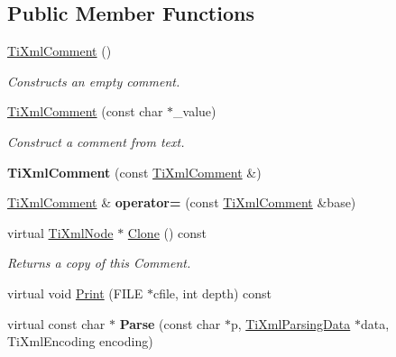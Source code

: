 \subsection*{Public Member Functions}
\begin{DoxyCompactItemize}
\item 
\hyperlink{classTiXmlComment_aaa3252031d3e8bd3a2bf51a1c61201b7}{Ti\+Xml\+Comment} ()\hypertarget{classTiXmlComment_aaa3252031d3e8bd3a2bf51a1c61201b7}{}\label{classTiXmlComment_aaa3252031d3e8bd3a2bf51a1c61201b7}

\begin{DoxyCompactList}\small\item\em Constructs an empty comment. \end{DoxyCompactList}\item 
\hyperlink{classTiXmlComment_a37e7802ef17bc03ebe5ae79bf0713d47}{Ti\+Xml\+Comment} (const char $\ast$\+\_\+value)\hypertarget{classTiXmlComment_a37e7802ef17bc03ebe5ae79bf0713d47}{}\label{classTiXmlComment_a37e7802ef17bc03ebe5ae79bf0713d47}

\begin{DoxyCompactList}\small\item\em Construct a comment from text. \end{DoxyCompactList}\item 
{\bfseries Ti\+Xml\+Comment} (const \hyperlink{classTiXmlComment}{Ti\+Xml\+Comment} \&)\hypertarget{classTiXmlComment_afaec41ac2760ce946ba1590eb5708e50}{}\label{classTiXmlComment_afaec41ac2760ce946ba1590eb5708e50}

\item 
\hyperlink{classTiXmlComment}{Ti\+Xml\+Comment} \& {\bfseries operator=} (const \hyperlink{classTiXmlComment}{Ti\+Xml\+Comment} \&base)\hypertarget{classTiXmlComment_aeceedc15f8b8f9ca0b6136696339b3ac}{}\label{classTiXmlComment_aeceedc15f8b8f9ca0b6136696339b3ac}

\item 
virtual \hyperlink{classTiXmlNode}{Ti\+Xml\+Node} $\ast$ \hyperlink{classTiXmlComment_a4f6590c9c9a2b63a48972655b78eb853}{Clone} () const \hypertarget{classTiXmlComment_a4f6590c9c9a2b63a48972655b78eb853}{}\label{classTiXmlComment_a4f6590c9c9a2b63a48972655b78eb853}

\begin{DoxyCompactList}\small\item\em Returns a copy of this Comment. \end{DoxyCompactList}\item 
virtual void \hyperlink{classTiXmlComment_a17398061d62c470f57801ce28fa33ad4}{Print} (F\+I\+LE $\ast$cfile, int depth) const 
\item 
virtual const char $\ast$ {\bfseries Parse} (const char $\ast$p, \hyperlink{classTiXmlParsingData}{Ti\+Xml\+Parsing\+Data} $\ast$data, Ti\+Xml\+Encoding encoding)\hypertarget{classTiXmlComment_a43bddc18ac057734b41d84653b71d3e0}{}\label{classTiXmlComment_a43bddc18ac057734b41d84653b71d3e0}


\end{DoxyCompactItemize}
